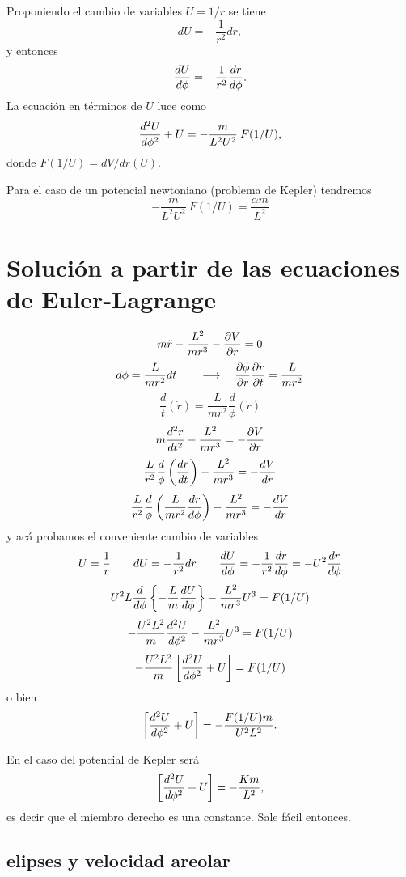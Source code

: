 \documentclass[10pt,oneside]{CBFT_book}
\begin{document}
Proponiendo el cambio de variables $U = 1/r$ se tiene 
\[
	dU = -\frac{1}{r^2} dr,
\]
y entonces
\[
	\dtot{U}{\phi} = -\frac{1}{r^2} \dtot{r}{\phi}.
\]
La ecuación en términos de $U$ luce como
\[
	\dtot[2]{U}{\phi} + U = -\frac{m}{L^2U^2} \: F(1/U),
\]
donde $F(1/U) = dV / dr(U)$.

Para el caso de un potencial newtoniano (problema de Kepler) tendremos 
\[
	-\frac{m}{L^2U^2} \: F(1/U) = \frac{\alpha m}{L^2}
\]

\section{Solución a partir de las ecuaciones de Euler-Lagrange}

\[
	m \ddot{r} -\frac{L^2}{m r^3} -\dpar{V}{r}= 0 
\]
\[
	d \phi = \frac{L}{m r^2} dt \qquad \longrightarrow \quad  \dpar{\phi}{r}\dpar{r}{t}  = \frac{L}{m r^2}
\]
\[
	\frac{d}{t}(\dot{r}) = \frac{L}{m r^2} \frac{d}{\phi}(\dot{r})
\]
\[
	m \dtot[2]{r}{t} -\frac{L^2}{m r^3} = -\dpar{V}{r}
\]
\[
	\frac{L}{r^2} \frac{d}{\phi}\left( \dtot{r}{t} \right) -\frac{L^2}{m r^3} = -\dtot{V}{r}
\]
\[
	\frac{L}{r^2} \frac{d}{\phi}\left( \frac{L}{m r^2}\dtot{r}{\phi} \right) -\frac{L^2}{m r^3} = -\dtot{V}{r}
\]
y acá probamos el conveniente cambio de variables
\[
	U = \frac{1}{r} \qquad dU = -\frac{1}{r^2} dr 
	\qquad \dtot{U}{\phi} = -\frac{1}{r^2}\dtot{r}{\phi} = -U^2\dtot{r}{\phi}
\]
\[
	U^2 L \frac{d}{d\phi} \left\{ -\frac{L}{m}\dtot{U}{\phi} \right\} - \frac{L^2}{m r^3} U^3 = F(1/U)
\]
\[
	- \frac{U^2 L^2}{m} \dtot[2]{U}{\phi} - \frac{L^2}{m r^3} U^3 = F(1/U)
\]
\[
	- \frac{U^2 L^2}{m} \left[ \dtot[2]{U}{\phi} + U \right] = F(1/U)
\]
o bien
\[
	\left[ \dtot[2]{U}{\phi} + U \right] = - \frac{F(1/U) m}{U^2 L^2}. 
\]

En el caso del potencial de Kepler será 
\[
	\left[ \dtot[2]{U}{\phi} + U \right] = - \frac{K m}{L^2},
\]
es decir que el miembro derecho es una constante. Sale fácil entonces.

\subsection{elipses y velocidad areolar}
\end{document}
